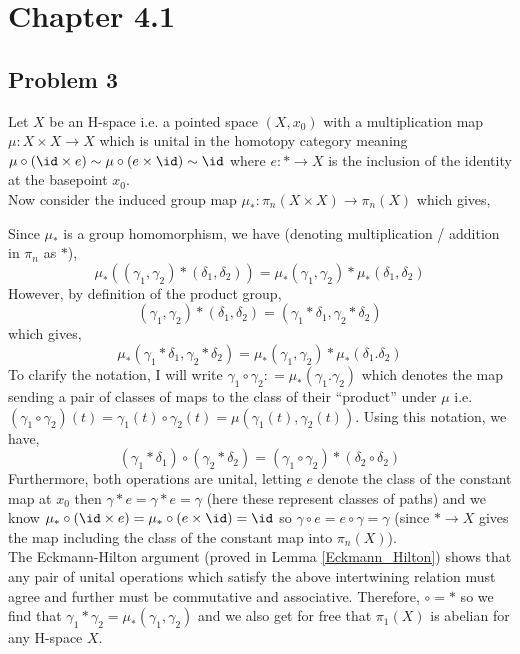 \documentclass[12pt]{extarticle}
\begin{document}
\section{Chapter 4.1}

\subsection{Problem 3}

Let $X$ be an H-space i.e. a pointed space $(X, x_0)$ with a multiplication map $\mu : X \times X \to X$ which is unital in the homotopy category meaning $\mu \circ (\id \times e) \sim \mu \circ (e \times \id) \sim \id$ where $e : * \to X$ is the inclusion of the identity at the basepoint $x_0$.
\bigskip\\
Now consider the induced group map $\mu_* : \pi_n(X \times X) \to \pi_n(X)$ which gives,
\begin{center}
\end{center}
Since $\mu_*$ is a group homomorphism, we have (denoting multiplication / addition in $\pi_n$ as $*$),
\[ \mu_*((\gamma_1, \gamma_2) * (\delta_1, \delta_2)) = \mu_*(\gamma_1, \gamma_2) * \mu_*(\delta_1, \delta_2) \]
However, by definition of the product group,
\[ (\gamma_1, \gamma_2) * (\delta_1, \delta_2) = (\gamma_1 * \delta_1, \gamma_2 * \delta_2) \]
which gives,
\[ \mu_*(\gamma_1 * \delta_1, \gamma_2 * \delta_2) = \mu_*(\gamma_1, \gamma_2) * \mu_*(\delta_1. \delta_2) \]
To clarify the notation, I will write $\gamma_1 \circ \gamma_2 : = \mu_*(\gamma_1. \gamma_2)$ which denotes the map sending a pair of classes of maps to the class of their ``product'' under $\mu$ i.e. $(\gamma_1 \circ \gamma_2)(t) = \gamma_1(t) \circ \gamma_2(t) = \mu(\gamma_1(t), \gamma_2(t))$. Using this notation, we have,
\[ (\gamma_1 * \delta_1) \circ (\gamma_2 * \delta_2) = (\gamma_1 \circ \gamma_2) * (\delta_2 \circ \delta_2) \]
Furthermore, both operations are unital, letting $e$ denote the class of the constant map at $x_0$ then $\gamma * e = \gamma * e = \gamma$ (here these represent classes of paths) and we know $\mu_* \circ (\id \times e) = \mu_* \circ (e \times \id) = \id$ so $\gamma \circ e = e \circ \gamma = \gamma$ (since $* \to X$ gives the map including the class of the constant map into $\pi_n(X)$). 
\bigskip\\
The Eckmann-Hilton argument (proved in Lemma \ref{Eckmann_Hilton}) shows that any pair of unital operations which satisfy the above intertwining relation must agree and further must be commutative and associative. Therefore, $\circ = *$ so we find that $\gamma_1 * \gamma_2 = \mu_*(\gamma_1, \gamma_2)$ and we also get for free that $\pi_1(X)$ is abelian for any H-space $X$. 
\end{document}
